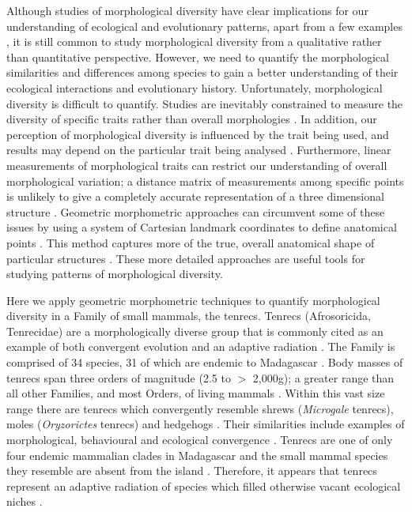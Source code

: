 \documentclass[12pt,a4paper]{article}
\begin{document}
	Although studies of morphological diversity have clear implications for our understanding of ecological and evolutionary patterns, apart from a few examples \citep[e.g.][]{Ruta2013, Goswami2011, Brusatte2008}, it is still common to study morphological diversity from a qualitative rather than quantitative perspective. However, we need to quantify the morphological similarities and differences among species to gain a better understanding of their ecological interactions and evolutionary history. Unfortunately, morphological diversity is difficult to quantify. Studies are inevitably constrained to measure the diversity of specific traits rather than overall morphologies \citep{Roy1997}. In addition, our perception of morphological diversity is influenced by the trait being used, and results may depend on the particular trait being analysed \citep{Foth2012}. Furthermore, linear measurements of morphological traits can restrict our understanding of overall morphological variation; a distance matrix of measurements among specific points is unlikely to give a completely accurate representation of a three dimensional structure \citep{Rohlf1993}. Geometric morphometric approaches can circumvent some of these issues by using a system of Cartesian landmark coordinates to define anatomical points \citep{Adams2004}. This method captures more of the true, overall anatomical shape of particular structures \citep{Mitteroecker2009}. These more detailed approaches are useful tools for studying patterns of morphological diversity.
	
	Here we apply geometric morphometric techniques to quantify morphological diversity in a Family of small mammals, the tenrecs. Tenrecs (Afrosoricida, Tenrecidae) are a morphologically diverse group that is commonly cited as an example of both convergent evolution and an adaptive radiation \citep{Soarimalala2011, Eisenberg1969}. The Family is comprised of 34 species, 31 of which are endemic to Madagascar \citep{Olson2013}. Body masses of tenrecs span three orders of magnitude (2.5 to $>$ 2,000g); a greater range than all other Families, and most Orders, of living mammals \citep{Olson2003}. Within this vast size range there are tenrecs which convergently resemble shrews (\textit{Microgale} tenrecs), moles (\textit{Oryzorictes} tenrecs) and hedgehogs \citep[\textit{Echinops} and \textit{Setifer} tenrecs,][]{Eisenberg1969}. Their similarities include examples of morphological, behavioural and ecological convergence \citep{Soarimalala2011}. Tenrecs are one of only four endemic mammalian clades in Madagascar and the small mammal species they resemble are absent from the island \citep{Garbutt1999}. Therefore, it appears that tenrecs represent an adaptive radiation of species which filled otherwise vacant ecological niches \citep{Soarimalala2011}.
	
\end{document}

